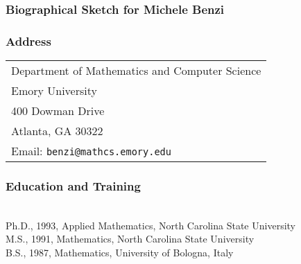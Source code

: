 

\subsubsection{Biographical Sketch for Michele Benzi}

\subsubsection*{Address}
\vspace*{-1ex}
\begin{tabular}{l}
  Department of Mathematics and Computer Science \\
  Emory University \\
  400 Dowman Drive \\
  Atlanta, GA 30322 \\
  Email: {\tt benzi@mathcs.emory.edu}
\end{tabular}

\subsubsection*{Education and Training}
\vspace*{-1ex}
\vspace*{-2ex}
\begin{tabbing}
\hspace*{3em}  \= \\
\> Ph.D., 1993, Applied Mathematics, North Carolina State University \\
\> M.S., 1991,  Mathematics, North Carolina State University\\
\> B.S., 1987,  Mathematics, University of Bologna, Italy\\
\end{tabbing}
\vspace*{-4ex}

